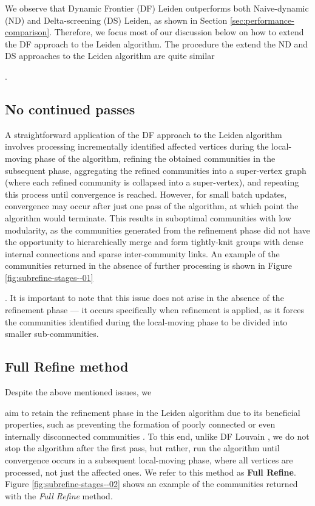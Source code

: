 We observe that Dynamic Frontier (DF) Leiden outperforms both Naive-dynamic (ND) and Delta-screening (DS) Leiden, as shown in Section \ref{sec:performance-comparison}. Therefore, we focus most of our discussion below on how to extend the DF approach to the Leiden algorithm. The procedure the extend the ND and DS approaches to the Leiden algorithm are quite similar.




\subsection{No continued passes}
\label{sec:no-continued-passes}

A straightforward application of the DF approach to the Leiden algorithm involves processing incrementally identified affected vertices during the local-moving phase of the algorithm, refining the obtained communities in the subsequent phase, aggregating the refined communities into a super-vertex graph (where each refined community is collapsed into a super-vertex), and repeating this process until convergence is reached. However, for small batch updates, convergence may occur after just one pass of the algorithm, at which point the algorithm would terminate. This results in suboptimal communities with low modularity, as the communities generated from the refinement phase did not have the opportunity to hierarchically merge and form tightly-knit groups with dense internal connections and sparse inter-community links. An example of the communities returned in the absence of further processing is shown in Figure \ref{fig:subrefine-stages--01}. It is important to note that this issue does not arise in the absence of the refinement phase --- it occurs specifically when refinement is applied, as it forces the communities identified during the local-moving phase to be divided into smaller sub-communities. 






\subsection{Full Refine method}
\label{sec:full-refine-method}

Despite the above mentioned issues, we aim to retain the refinement phase in the Leiden algorithm due to its beneficial properties, such as preventing the formation of poorly connected or even internally disconnected communities \cite{com-traag19}. To this end, unlike DF Louvain \cite{sahu2024shared}, we do not stop the algorithm after the first pass, but rather, run the algorithm until convergence occurs in a subsequent local-moving phase, where all vertices are processed, not just the affected ones. We refer to this method as \textbf{Full Refine}. Figure \ref{fig:subrefine-stages--02} shows an example of the communities returned with the \textit{Full Refine} method.




